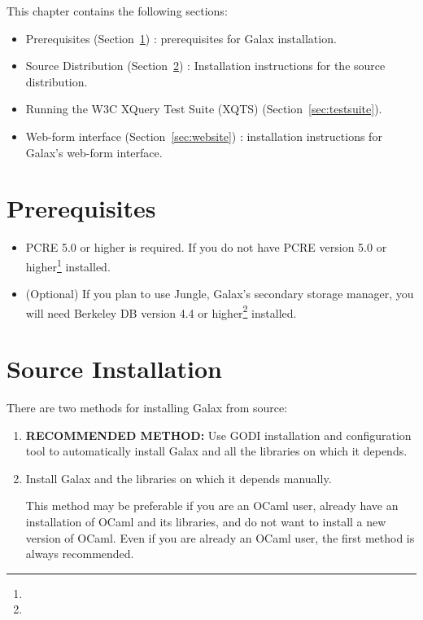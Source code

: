This chapter contains the following sections:
\begin{itemize}
\item Prerequisites (Section~\ref{sec:prelim}) : prerequisites for
  Galax installation.
\item Source Distribution (Section~\ref{sec:src-dist}) :  
  Installation instructions for the source distribution.
\item Running the W3C XQuery Test Suite (XQTS)
(Section~\ref{sec:testsuite}).
\item Web-form interface (Section~\ref{sec:website}) : installation
instructions for Galax's web-form interface.
\end{itemize}

\section{Prerequisites}
\label{sec:prelim}
\begin{itemize}
\item PCRE 5.0 or higher is required. If you do not have PCRE version
  5.0 or higher\footnote{} installed.
\item (Optional) If you plan to use Jungle, Galax's secondary storage
  manager, you will need Berkeley DB version 4.4 or
  higher\footnote{}
  installed.
\end{itemize}

\section{Source Installation}
\label{sec:src-dist}

There are two methods for installing Galax from source:

\begin{enumerate}
\item \textbf{RECOMMENDED METHOD:} Use GODI installation and configuration tool
     to automatically install Galax and all the libraries on which it
     depends.

\item Install Galax and the libraries on which it depends manually.

This method may be preferable if you are an OCaml user, already have
an installation of OCaml and its libraries, and do not want to install
a new version of OCaml.  Even if you are already an OCaml user, the
first method is always recommended.
\end{enumerate}

